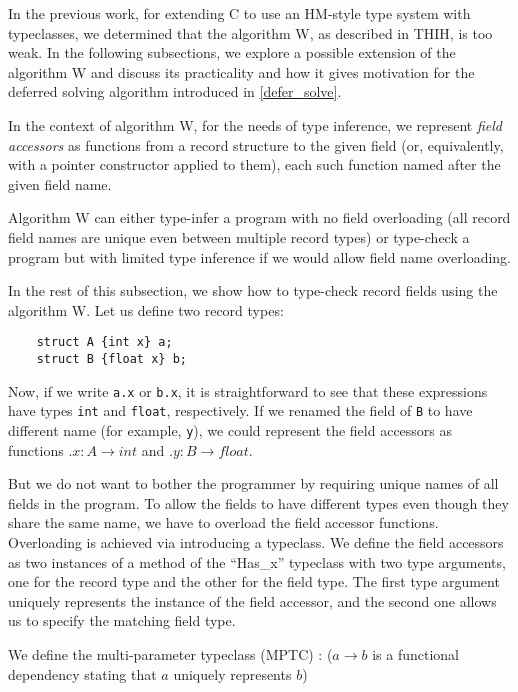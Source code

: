 In the previous work, for extending C to use an HM-style type system with typeclasses, we determined that the algorithm W, as described in THIH, is too weak. In the following subsections, we explore a possible extension of the algorithm W and discuss its practicality and how it gives motivation for the deferred solving algorithm introduced in \cref{defer_solve}.

In the context of algorithm W, for the needs of type inference, we represent \emph{field accessors} as functions from a record structure to the given field (or, equivalently, with a pointer constructor applied to them), each such function named after the given field name.

Algorithm W can either type-infer a program with no field overloading (all record field names are unique even between multiple record types) or type-check a program but with limited type inference if we would allow field name overloading.

In the rest of this subsection, we show how to type-check record fields using the algorithm W. Let us define two record types:

\begin{lstlisting}
    struct A {int x} a;
    struct B {float x} b;
\end{lstlisting}

Now, if we write \lstinline{a.x} or \lstinline{b.x}, it is straightforward to see that these expressions have types \lstinline{int} and \lstinline{float}, respectively. If we renamed the field of \lstinline{B} to have different name (for example, \lstinline{y}), we could represent the field accessors as functions $.x : A \to int$ and $.y : B \to float$.

But we do not want to bother the programmer by requiring unique names of all fields in the program. To allow the fields to have different types even though they share the same name, we have to overload the field accessor functions. Overloading is achieved via introducing a typeclass. We define the field accessors as two instances of a method  of the ``Has\_x'' typeclass with two type arguments, one for the record type and the other for the field type. The first type argument uniquely represents the instance of the field accessor, and the second one allows us to specify the matching field type.

We define the multi-parameter typeclass (MPTC) : ($a \to b$ is a functional dependency stating that $a$ uniquely represents $b$)

